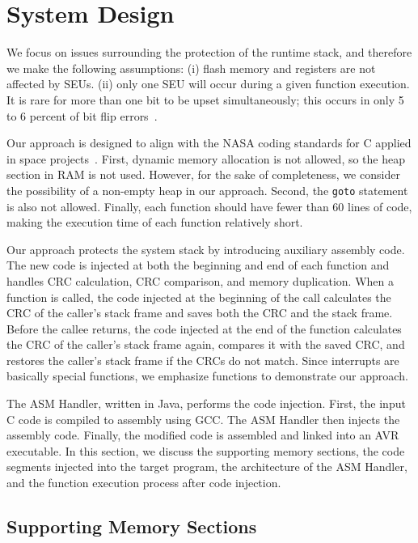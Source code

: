 \section{System Design}\label{sec:design}

We focus on issues surrounding the protection of the runtime stack, and therefore we make the following assumptions: (i) flash memory and registers are not affected by SEUs. (ii) only one SEU will occur during a given function execution. It is rare for more than one bit to be upset simultaneously; this occurs in only 5 to 6 percent of bit flip errors~\cite{underwood1992sramorbit}. 

Our approach is designed to align with the NASA coding standards for C applied in space projects~\cite{nasa_coding_standard}. First, dynamic memory allocation is not allowed, so the heap section in RAM is not used. However, for the sake of completeness, we consider the possibility of a non-empty heap in our approach. Second, the \texttt{goto} statement is also not allowed. Finally, each function should have fewer than 60 lines of code, making the execution time of each function relatively short.

Our approach protects the system stack by introducing auxiliary assembly code. The new code is injected at both the beginning and end of each function and handles CRC calculation, CRC comparison, and memory duplication. When a function is called, the code injected at the beginning of the call calculates the CRC of the caller's stack frame and saves both the CRC and the stack frame. Before the callee returns, the code injected at the end of the function calculates the CRC of the caller's stack frame again, compares it with the saved CRC, and restores the caller's stack frame if the CRCs do not match. Since interrupts are basically special functions, we emphasize functions to demonstrate our approach.

The ASM Handler, written in Java, performs the code injection. First, the input C code is compiled to assembly using GCC. The ASM Handler then injects the assembly code. Finally, the modified code is assembled and linked into an AVR executable. In this section, we discuss the supporting memory sections, the code segments injected into the target program, the architecture of the ASM Handler, and the function execution process after code injection.

\subsection{Supporting Memory Sections}\label{sec:memory_sections}

